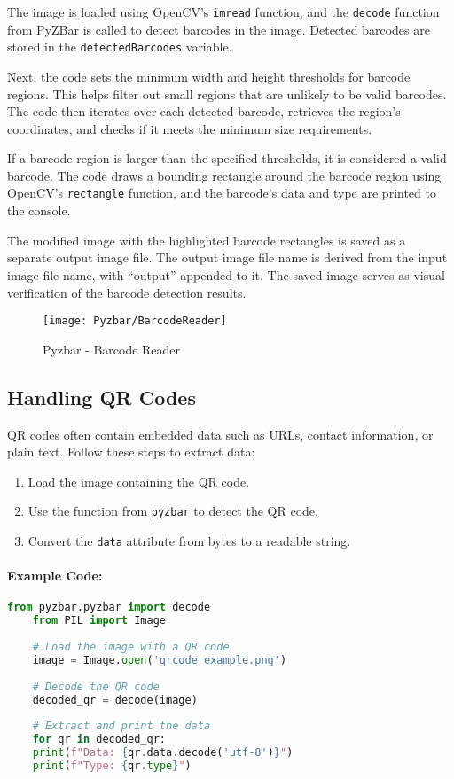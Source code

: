 The image is loaded using OpenCV’s \texttt{imread} function, and the \texttt{decode} function from PyZBar is called to detect barcodes in the image. Detected barcodes are stored in the \texttt{detectedBarcodes} variable.

Next, the code sets the minimum width and height thresholds for barcode regions. This helps filter out small regions that are unlikely to be valid barcodes. The code then iterates over each detected barcode, retrieves the region’s coordinates, and checks if it meets the minimum size requirements.

If a barcode region is larger than the specified thresholds, it is considered a valid barcode. The code draws a bounding rectangle around the barcode region using OpenCV’s \texttt{rectangle} function, and the barcode's data and type are printed to the console.

The modified image with the highlighted barcode rectangles is saved as a separate output image file. The output image file name is derived from the input image file name, with “output” appended to it. The saved image serves as visual verification of the barcode detection results.\cite{Utekarbarcode:2023}

\begin{figure}[h]
	\centering
	\texttt{[image: Pyzbar/BarcodeReader]}
	\caption{Pyzbar - Barcode Reader}\label{Barcode Reader}
\end{figure}


\subsection{Handling QR Codes}
QR codes often contain embedded data such as URLs, contact information, or plain text. Follow these steps to extract data:
\begin{enumerate}
	\item Load the image containing the QR code.
	\item Use the  function from \texttt{pyzbar} to detect the QR code.
	\item Convert the \texttt{data} attribute from bytes to a readable string.
\end{enumerate}

\paragraph{Example Code:}
\begin{lstlisting}[language=Python]
	from pyzbar.pyzbar import decode
	from PIL import Image
	
	# Load the image with a QR code
	image = Image.open('qrcode_example.png')
	
	# Decode the QR code
	decoded_qr = decode(image)
	
	# Extract and print the data
	for qr in decoded_qr:
	print(f"Data: {qr.data.decode('utf-8')}")
	print(f"Type: {qr.type}")
\end{lstlisting}


